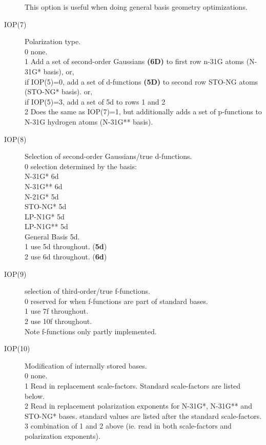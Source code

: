 \begin{description}
This option is useful when doing general basis geometry optimizations.
\item[IOP(7)]  Polarization type.  \\
0  none. \\
1  Add a set of second-order Gaussians {\bf (6D)} to first row n-31G 
atoms (N-31G* basis),
or, \\
if IOP(5)=0, add a set of d-functions {\bf (5D)} to second
row STO-NG atoms (STO-NG* basis).
or, \\
if IOP(5)=3, add a set of 5d to rows 1 and 2  \\
2  Does the same as IOP(7)=1, but additionally adds a set 
of p-functions to N-31G hydrogen atoms (N-31G** basis). \\
\item[IOP(8)]  Selection of second-order Gaussians/true d-functions. \\
0  selection determined by the basis: \\
N-31G*      6d  \\
N-31G**     6d  \\
N-21G*      5d  \\
STO-NG*     5d  \\
LP-N1G*     5d  \\
LP-N1G**    5d  \\
General Basis  5d.  \\
1  use 5d throughout.  ({\bf 5d}) \\
2  use 6d throughout.  ({\bf 6d}) \\
\item[IOP(9)]  selection of third-order/true f-functions. \\
0  reserved for when f-functions are part of standard bases. \\
1  use 7f throughout. \\
2  use 10f throughout. \\
Note f-functions only partly implemented.
\item[IOP(10)]  Modification of internally stored bases.  \\
0  none. \\
1  Read in replacement scale-factors. Standard scale-factors
are listed below.  \\
2  Read in replacement polarization exponents for N-31G*, 
N-31G** and STO-NG* bases. standard values are listed
after the standard scale-factors.  \\
3  combination of 1 and 2 above (ie. read in both scale-factors 
and polarization exponents).  \\

\end{description}
